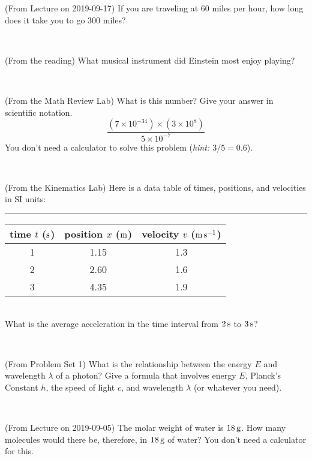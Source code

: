 \documentclass[12pt, letterpaper]{article}
\begin{document}
\begin{problem} (From Lecture on 2019-09-17)
If you are traveling at 60 miles per hour, how long does
it take you to go 300 miles?
\end{problem}


\vfill ~

\begin{problem} (From the reading)
What musical instrument did Einstein most enjoy playing?
\end{problem}


\vfill ~

\begin{problem} (From the Math Review Lab)
What is this number? Give your answer in scientific notation.
$$
\frac{(7\times10^{-34})\times(3\times10^8)}{5\times10^{-7}}
$$
You don't need a calculator to solve this problem (\textit{hint: $3/5=0.6$}).
\end{problem}


\vfill ~


\clearpage


\begin{problem} (From the Kinematics Lab)
Here is a data table of times, positions, and velocities in SI units:\\
\rule{1.0in}{0pt}\begin{tabular}{c|c|c}
time $t$ ($\mathrm{s}$) & position $x$ ($\mathrm{m}$) & velocity $v$ ($\mathrm{m}\,\mathrm{s}^{-1}$) \\
\hline
1 & 1.15 & 1.3 \\
2 & 2.60 & 1.6 \\
3 & 4.35 & 1.9 \\
\hline
\end{tabular}\\
What is the average acceleration in the time interval from $2\,\mathrm{s}$ to $3\,\mathrm{s}$?
\end{problem}


\vfill ~

\begin{problem} (From Problem Set 1)
What is the relationship between the energy $E$ and wavelength
$\lambda$ of a photon? Give a formula that involves energy $E$,
Planck's Constant $h$, the speed of light $c$, and wavelength
$\lambda$ (or whatever you need).
\end{problem}

\vfill ~

\begin{problem} (From Lecture on 2019-09-05)
The molar weight of water is $18\,\mathrm{g}$. How many molecules would there
be, therefore, in $18\,\mathrm{g}$ of water? You don't need a calculator for
this.
\end{problem}
\end{document}
